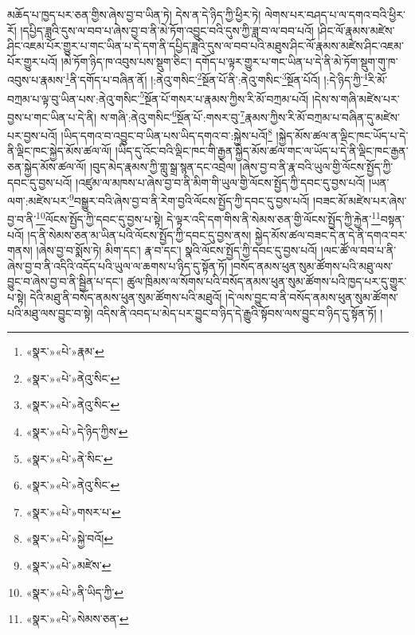 མཆོད་པ་ཁྱད་པར་ཅན་གྱིས་ཞེས་བྱ་བ་ཡིན་ཏེ། དེས་ན་དེ་ཉིད་ཀྱི་ཕྱིར་ཏེ། ལེགས་པར་བཤད་པ་ལ་དགའ་བའི་ཕྱིར་རོ། །དཔྱིད་ཟླའི་དུས་ལ་བབ་པ་ཞེས་བྱ་བ་ནི་མེ་ཏོག་འབྱུང་བའི་དུས་ཀྱི་ཟླ་བ་ལ་བབ་པའོ། །ཤིང་ལོ་རྣམས་མཛེས་ཤིང་འཇམ་པོར་གྱུར་པ་གང་ཡིན་པ་དེ་དག་ནི་དཔྱིད་ཟླའི་དུས་ལ་བབ་པའི་མཐུས་ཤིང་ལོ་རྣམས་མཛེས་ཤིང་འཇམ་པོར་གྱུར་པའོ། །མེ་ཏོག་ཉིད་ཁ་འབུས་པས་སྡུག་ཅིང་། དགོད་པ་ལྟར་གྱུར་པ་གང་ཡིན་པ་དེ་ནི་མེ་ཏོག་སྡུག་གུ་ཁ་འབུས་པ་རྣམས་\footnote{«སྣར་»«པེ་»རྣམ་}ནི་དགོད་པ་བཞིན་ནོ། །:ནེའུ་གསིང་\footnote{«སྣར་»«པེ་»ནེའུ་སིང་}སྔོན་པོ་ནི་:ནེའུ་གསིང་\footnote{«སྣར་»«པེ་»ནེའུ་སིང་}སྔོན་པོའོ། །:དེ་ཉིད་ཀྱི་\footnote{«སྣར་»«པེ་»དེ་ཉིད་ཀྱིས་}རི་མོ་བཀྲམ་པ་ལྟ་བུ་ཡིན་པས་:ནེའུ་གསིང་\footnote{«སྣར་»«པེ་»ནེ་སིང་}སྔོན་པོ་གསར་པ་རྣམས་ཀྱིས་རི་མོ་བཀྲམ་པའོ། །དེས་ས་གཞི་མཛེས་པར་བྱས་པ་གང་ཡིན་པ་དེ་ནི། ས་གཞི་:ནེའུ་གསིང་\footnote{«སྣར་»«པེ་»ནེའུ་སིང་}སྔོན་པོ་:གསར་བུ་\footnote{«སྣར་»«པེ་»གསར་པ་}རྣམས་ཀྱིས་རི་མོ་བཀྲམ་པ་བཞིན་དུ་མཛེས་པར་བྱས་པའོ། །ཡིད་དགའ་བ་འབྱུང་བ་ཡིན་པས་ཡིད་དགའ་བ་:སྐྱེས་པའོ།\footnote{«སྣར་»«པེ་»སྐྱེ་བའོ།} །སྐྱེད་མོས་ཚལ་ན་ལྡིང་ཁང་ཡོད་པ་དེ་ནི་ལྡིང་ཁང་སྐྱེད་མོས་ཚལ་ལོ། །ཡིད་དུ་འོང་བའི་ལྡིང་ཁང་གི་རྒྱན་སྐྱེད་མོས་ཚལ་གང་ལ་ཡོད་པ་དེ་ནི་ལྡིང་ཁང་རྒྱན་ཅན་སྐྱེད་མོས་ཚལ་ལོ། །བུད་མེད་རྣམས་ཀྱི་གླུ་སྒྲ་སྙན་དང་འབྲེལ། །ཞེས་བྱ་བ་ནི་རྣ་བའི་ཡུལ་གྱི་ལོངས་སྤྱོད་ཀྱི་དབང་དུ་བྱས་པའོ། །འཛུམ་ལ་མཁས་པ་ཞེས་བྱ་བ་ནི་མིག་གི་ཡུལ་གྱི་ལོངས་སྤྱོད་ཀྱི་དབང་དུ་བྱས་པའོ། །ཡན་ལག་:མཛེས་པར་\footnote{«སྣར་»«པེ་»མཛེས་}བསྒྱུར་བའི་ཞེས་བྱ་བ་ནི་རེག་བྱའི་ལོངས་སྤྱོད་ཀྱི་དབང་དུ་བྱས་པའོ། །བཟང་མོ་མཛེས་པར་ཞེས་བྱ་བ་ནི་\footnote{«སྣར་»«པེ་»ནི་ཡིད་ཀྱི་}ལོངས་སྤྱོད་ཀྱི་དབང་དུ་བྱས་པ་སྟེ། དེ་ལྟར་འདི་དག་གིས་ནི་སེམས་ཅན་གྱི་ལོངས་སྤྱོད་ཀྱི་རྐྱེན་\footnote{«སྣར་»«པེ་»སེམས་ཅན་}བསྟན་པའོ། །ད་ནི་སེམས་ཅན་མ་ཡིན་པའི་ལོངས་སྤྱོད་ཀྱི་དབང་དུ་བྱས་ནས། སྐྱེད་མོས་ཚལ་བཟང་དེ་ན་དེ་ནི་དགའ་བར་གནས། །ཞེས་བྱ་བ་སྨོས་ཏེ། མིག་དང་། རྣ་བ་དང་། སྣའི་ལོངས་སྤྱོད་ཀྱི་དབང་དུ་བྱས་པའོ། །ལང་ཚོ་ལ་བབ་པ་ནི་ཞེས་བྱ་བ་ནི་འདིའི་འདོད་པའི་ཡུལ་ལ་ཆགས་པ་ཉིད་དུ་སྟོན་ཏོ། །བསོད་ནམས་ཕུན་སུམ་ཚོགས་པའི་མཐུ་ལས་བྱུང་བ་ཞེས་བྱ་བ་ནི་སྦྱིན་པ་དང་། ཚུལ་ཁྲིམས་ལ་སོགས་པའི་བསོད་ནམས་ཕུན་སུམ་ཚོགས་པའི་ཁྱད་པར་དུ་གྱུར་པ་སྟེ། དེའི་མཐུ་ནི་བསོད་ནམས་ཕུན་སུམ་ཚོགས་པའི་མཐུའོ། །དེ་ལས་བྱུང་བ་ནི་བསོད་ནམས་ཕུན་སུམ་ཚོགས་པའི་མཐུ་ལས་བྱུང་བ་སྟེ། འདིས་ནི་འབད་པ་མེད་པར་བྱུང་བ་ཉིད་དེ་རྒྱུའི་སྟོབས་ལས་བྱུང་བ་ཉིད་དུ་སྟོན་ཏོ། །
